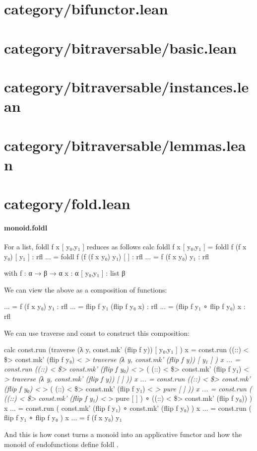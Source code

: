 \documentclass{article}
\begin{document}
\section{category/bifunctor.lean}\section{category/bitraversable/basic.lean}\section{category/bitraversable/instances.lean}\section{category/bitraversable/lemmas.lean}\section{category/fold.lean}\paragraph{monoid.foldl}
\par
For a list, foldl f x 
{[}
y₀,y₁
{]}
 reduces as follows
calc  foldl f x 
{[}
y₀,y₁
{]}
= foldl f (f x y₀) 
{[}
y₁
{]}
      : rfl
... = foldl f (f (f x y₀) y₁) 
{[}
{]}
 : rfl
... = f (f x y₀) y₁              : rfl
\par
with f : α → β → α
x : α
{[}
y₀,y₁
{]}
 : list β
\par
We can view the above as a composition of functions:
\par
... = f (f x y₀) y₁              : rfl
... = flip f y₁ (flip f y₀ x)    : rfl
... = (flip f y₁ ∘ flip f y₀) x  : rfl
\par
We can use traverse and const to construct this composition:
\par
calc   const.run (traverse (λ y, const.mk' (flip f y)) 
{[}
y₀,y₁
{]}
) x
= const.run ((::) 
<
\$> const.mk' (flip f y₀) 
<
\emph{> traverse (λ y, const.mk' (flip f y)) 
{[}
y₁
{]}
) x
...  = const.run ((::) 
<
\$> const.mk' (flip f y₀) 
<
}> ( (::) 
<
\$> const.mk' (flip f y₁) 
<
\emph{> traverse (λ y, const.mk' (flip f y)) 
{[}
{]}
 )) x
...  = const.run ((::) 
<
\$> const.mk' (flip f y₀) 
<
}> ( (::) 
<
\$> const.mk' (flip f y₁) 
<
\emph{> pure 
{[}
{]}
 )) x
...  = const.run ( ((::) 
<
\$> const.mk' (flip f y₁) 
<
}> pure 
{[}
{]}
) ∘ ((::) 
<
\$> const.mk' (flip f y₀)) ) x
...  = const.run ( const.mk' (flip f y₁) ∘ const.mk' (flip f y₀) ) x
...  = const.run ( flip f y₁ ∘ flip f y₀ ) x
...  = f (f x y₀) y₁
\par
And this is how 
\colorbox[RGB]{253,246,227}{{{{\color[RGB]{101, 123, 131} const }}}} turns a monoid into an applicative functor and
how the monoid of endofunctions define 
\colorbox[RGB]{253,246,227}{{{{\color[RGB]{101, 123, 131} foldl }}}}.
\end{document}
